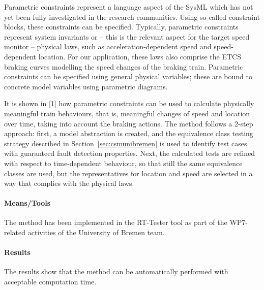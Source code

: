 Parametric constraints represent a language aspect of the SysML which has not yet
been fully investigated in the research communities. Using so-called constraint
blocks, these constraints can be specified. Typically, parametric constraints 
represent system invariants or -- this is the relevant aspect for the target speed monitor --
physical laws, such as acceleration-dependent speed and speed-dependent location. 
For our application, these laws also comprise the ETCS braking curves modelling the
speed changes of the braking train.
Parametric constraints can be specified using general physical variables; these are 
bound to concrete model variables using parametric diagrams. 

It is shown in [1] how parametric constraints can be used to calculate physically
meaningful train behaviours, that is, meaningful changes of speed and location over
time, taking into account the braking actions. The method follows a 2-step approach: 
first, a model abstraction is created, and  the equivalence class testing 
strategy described in Section~\ref{sec:csmunibremen} is used to identify
test cases with guaranteed fault detection properties. Next, the calculated tests
are refined with respect to time-dependent behaviour, so that still the same 
equivalence classes  are used, but the representatives for location and speed
are selected in a way that complies with the physical laws.

 


\paragraph{Means/Tools}

The method has been implemented in the RT-Tester tool as part of the WP7-related
activities of the University of Bremen team.

\paragraph{Results}

The results show that the method can be automatically performed with acceptable 
computation time. 

